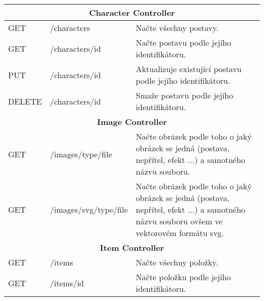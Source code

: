 \begin{longtable}{|l|l|p{}|}
    \hline
    \multicolumn{3}{|c|}{\textbf{Character Controller}}                                                                                                                                        \\
    \hline
    GET             & /characters                 & Načte všechny postavy.                                                                                                                     \\
    GET             & /characters/{id}            & Načte postavu podle jejího identifikátoru.                                                                                                 \\
    PUT             & /characters/{id}            & Aktualizuje existující postavu podle jejího identifikátoru.                                                                                \\
    DELETE          & /characters/{id}            & Smaže postavu podle jejího identifikátoru.                                                                                                 \\
    \hline
    \multicolumn{3}{|c|}{\textbf{Image Controller}}                                                                                                                                            \\
    \hline
    GET             & /images/{type}/{file}       & Načte obrázek podle toho o jaký obrázek se jedná (postava, nepřítel, efekt ...) a samotného názvu souboru.                                 \\
    GET             & /images/svg/{type}/{file}   & Načte obrázek podle toho o jaký obrázek se jedná (postava, nepřítel, efekt ...) a samotného názvu souboru ovšem ve vektorovém formátu svg. \\
    \hline
    \multicolumn{3}{|c|}{\textbf{Item Controller}}                                                                                                                                             \\
    \hline
    GET             & /items                      & Načte všechny položky.                                                                                                                     \\
    GET             & /items/{id}                 & Načte položku podle jejího identifikátoru.                                                                                                 \\

\end{longtable}
